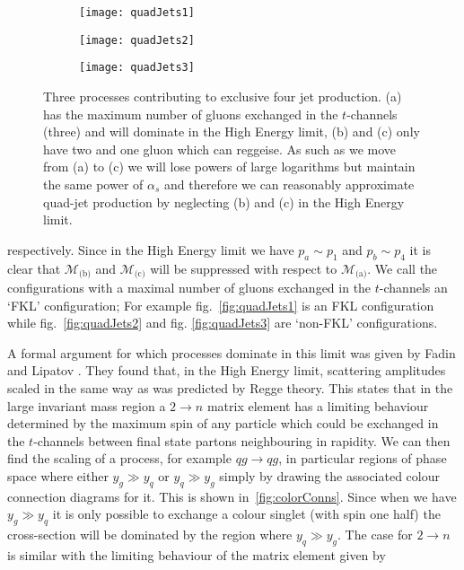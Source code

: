 	\begin{figure}[bt]

		\centering

		\begin{subfigure}[b]{0.31\textwidth}
			\texttt{[image: quadJets1]}
			\caption{}
			\label{fig:quadJets1}
		\end{subfigure}
		\begin{subfigure}[b]{0.31\textwidth}
			\texttt{[image: quadJets2]}
			\caption{}
			\label{fig:quadJets2}
		\end{subfigure}
		\begin{subfigure}[b]{0.31\textwidth}
			\texttt{[image: quadJets3]}
			\caption{}
			\label{fig:quadJets3}
		\end{subfigure}

		\caption{Three processes contributing to exclusive four jet production. (a) has the
		maximum number of gluons exchanged in the $t$-channels (three) and will dominate in the High
		Energy limit, (b) and (c) only have two and one gluon which can reggeise.  As such as we move
		from (a) to (c) we will lose powers of large logarithms but maintain the same power of
		$\alpha_s$ and therefore we can reasonably approximate quad-jet production by neglecting
		(b) and (c) in the High Energy limit.}
		\label{fig:quadJets}
	\end{figure}

	respectively.  Since in the High
	Energy limit we have $p_a\sim p_1$ and $p_b\sim p_4$ it is clear that $\mathcal{M}_{\text{(b)}}$
	and $\mathcal{M}_{\text{(c)}}$ will be suppressed with respect to $\mathcal{M}_{\text{(a)}}$. We call
	the configurations with a maximal number of gluons exchanged in the $t$-channels an `FKL' configuration;
	For example fig.~\eqref{fig:quadJets1} is an FKL configuration while fig.~\eqref{fig:quadJets2} and fig.
	\eqref{fig:quadJets3} are `non-FKL' configurations.

	A formal argument for which processes dominate in this limit was given by Fadin and Lipatov
	\cite{Kuraev:1976ge,Balitsky:1978ic}.  They found that, in the High Energy limit, scattering
	amplitudes scaled in the same way as was predicted by Regge theory.  This states that in the
	large invariant mass region a $2\to n$ matrix element has a limiting behaviour determined by
	the maximum spin of any particle which could be exchanged in the $t$-channels between final
	state partons neighbouring in rapidity.  We can then find the scaling of a process, for example
	$qg\to qg$, in particular regions of phase space where either $y_g\gg y_q$ or $y_q\gg y_g$ simply
	by drawing the associated colour connection diagrams for it.  This is shown in~\eqref{fig:colorConns}.
	Since when we have $y_g\gg y_q$ it is only possible to exchange a colour singlet (with spin one half)
	the cross-section will be dominated by the region where $y_q\gg y_g$.  The case for $2\to n$ is similar
	with the limiting behaviour of the matrix element given by

